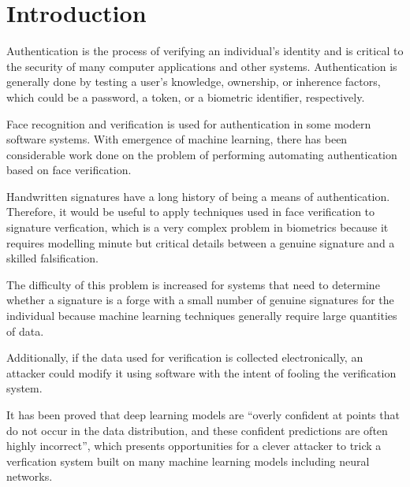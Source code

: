 \section{Introduction}\label{sec:introduction}

Authentication is the process of verifying an individual's identity and is critical to the security of many computer applications and other systems.
Authentication is generally done by testing a user's knowledge, ownership, or inherence factors, which could be a password, a token, or a biometric identifier, respectively\cite{authentication}.

Face recognition and verification is used for authentication in some modern software systems.
With emergence of machine learning, there has been considerable work done on the problem of performing automating authentication based on face verification\cite{sig_net}.

Handwritten signatures have a long history of being a means of authentication.
Therefore, it would be useful to apply techniques used in face verification to signature verfication, which is a very complex problem in biometrics because it requires modelling minute but critical details between a genuine signature and a skilled falsification\cite{sig_net}.

The difficulty of this problem is increased for systems that need to determine whether a signature is a forge with a small number of genuine signatures for the individual because machine learning techniques generally require large quantities of data.

Additionally, if the data used for verification is collected electronically, an attacker could modify it using software with the intent of fooling the verification system.

It has been proved that deep learning models are ``overly confident at points that do not occur in the data distribution, and these confident predictions are often highly incorrect'', which presents opportunities for a clever attacker to trick a verfication system built on many machine learning models including neural networks\cite{goodfellow}.
